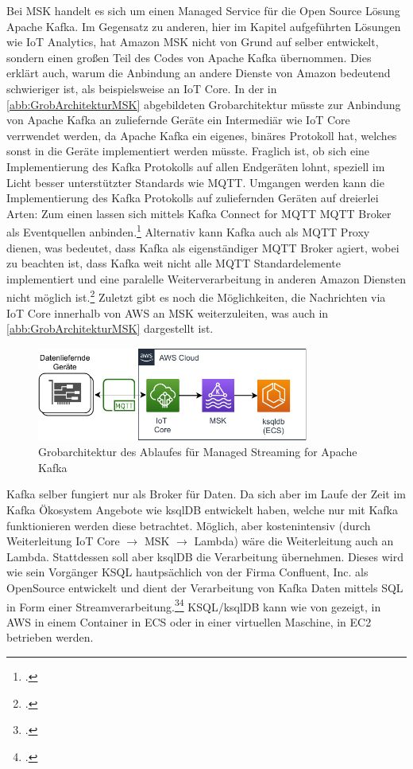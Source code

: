 Bei \ac{MSK} handelt es sich um einen Managed Service für die Open Source Lösung Apache Kafka. Im Gegensatz zu anderen, hier im Kapitel aufgeführten Lösungen wie \ac{IoT} Analytics, hat Amazon \ac{MSK} nicht von Grund auf selber entwickelt, sondern einen großen Teil des Codes von Apache Kafka übernommen. Dies erklärt auch, warum die Anbindung an andere Dienste von Amazon bedeutend schwieriger ist, als beispielsweise an \ac{IoT} Core. In der in \autoref{abb:GrobArchitekturMSK} abgebildeten Grobarchitektur müsste zur Anbindung von Apache Kafka an zuliefernde Geräte ein Intermediär wie \ac{IoT} Core verrwendet werden, da Apache Kafka ein eigenes, binäres Protokoll hat, welches sonst in die Geräte implementiert werden müsste.  Fraglich ist, ob sich eine Implementierung des Kafka Protokolls auf allen Endgeräten lohnt, speziell im Licht besser unterstützter Standards wie \ac{MQTT}. Umgangen werden kann die Implementierung des Kafka Protokolls auf zuliefernden Geräten auf dreierlei Arten: Zum einen lassen sich mittels Kafka Connect for \ac{MQTT} \ac{MQTT} Broker als Eventquellen anbinden.\footcite[Vgl.][]{Erber.12.01.2021} Alternativ kann Kafka auch als \ac{MQTT} Proxy dienen, was bedeutet, dass Kafka als eigenständiger MQTT Broker agiert, wobei zu beachten ist, dass Kafka weit nicht alle \ac{MQTT} Standardelemente implementiert und eine paralelle Weiterverarbeitung in anderen Amazon Diensten nicht möglich ist.\footcite[Vgl.][]{Erber.12.01.2021} Zuletzt gibt es noch die Möglichkeiten, die Nachrichten via \ac{IoT} Core innerhalb von \ac{AWS} an \ac{MSK} weiterzuleiten, was auch in \autoref{abb:GrobArchitekturMSK} dargestellt ist.
\begin{figure}[H]
\centering
\includegraphics[width=0.8\textwidth]{graphics/MSK-general.pdf}
\caption{Grobarchitektur des Ablaufes für Managed Streaming for Apache Kafka}
\label{abb:GrobArchitekturMSK}
\end{figure}

Kafka selber fungiert nur als Broker für Daten. Da sich aber im Laufe der Zeit im Kafka Ökosystem Angebote wie ksqlDB entwickelt haben, welche nur mit Kafka funktionieren werden diese betrachtet. Möglich, aber kostenintensiv (durch Weiterleitung \ac{IoT} Core  $\rightarrow$ MSK  $\rightarrow$ Lambda) wäre die Weiterleitung auch an Lambda. Stattdessen soll aber ksqlDB die Verarbeitung übernehmen. Dieses wird wie sein Vorgänger KSQL hautpsächlich von der Firma Confluent, Inc. als OpenSource entwickelt und dient der Verarbeitung von Kafka Daten mittels \ac{SQL} in Form einer Streamverarbeitung.\footcite[Vgl.][]{Kreps.2019}\nzitat\footcite[Vgl.][]{Narkhede.2017} KSQL/ksqlDB kann wie von \citeauthor{Penz.2020} gezeigt, in \ac{AWS} in einem Container in \ac{ECS} oder in einer virtuellen Maschine, in \ac{EC2} betrieben werden.


